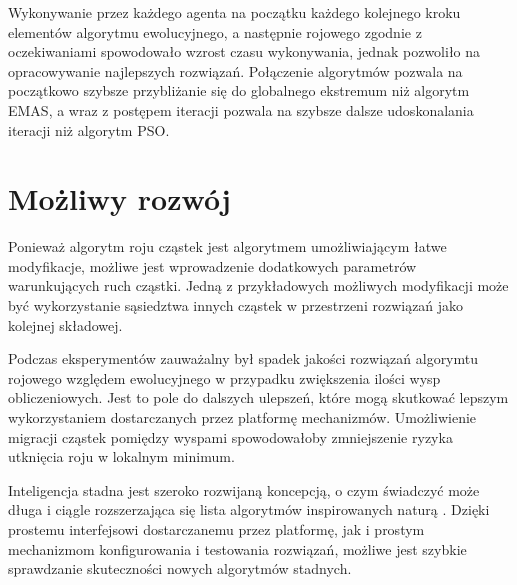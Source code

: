 Wykonywanie przez każdego agenta na początku każdego kolejnego kroku elementów algorytmu ewolucyjnego, a następnie rojowego zgodnie z oczekiwaniami spowodowało wzrost czasu wykonywania, jednak pozwoliło na opracowywanie najlepszych rozwiązań. Połączenie algorytmów pozwala na początkowo szybsze przybliżanie się do globalnego ekstremum niż algorytm EMAS, a wraz z postępem iteracji pozwala na szybsze dalsze udoskonalania iteracji niż algorytm PSO. 



\section{Możliwy rozwój}
Ponieważ algorytm roju cząstek jest algorytmem umożliwiającym łatwe modyfikacje, możliwe jest wprowadzenie dodatkowych parametrów warunkujących ruch cząstki. Jedną z przykładowych możliwych modyfikacji może być wykorzystanie sąsiedztwa innych cząstek w przestrzeni rozwiązań jako kolejnej składowej. 

Podczas eksperymentów zauważalny był spadek jakości rozwiązań algorymtu rojowego względem ewolucyjnego w przypadku zwiększenia ilości wysp obliczeniowych. Jest to pole do dalszych ulepszeń, które mogą skutkować lepszym wykorzystaniem dostarczanych przez platformę mechanizmów. Umożliwienie migracji cząstek pomiędzy wyspami spowodowałoby zmniejszenie ryzyka utknięcia roju w lokalnym minimum.

Inteligencja stadna jest szeroko rozwijaną koncepcją, o czym świadczyć może długa i ciągle rozszerzająca się lista algorytmów inspirowanych naturą \cite{listaswarm}. Dzięki prostemu interfejsowi dostarczanemu przez platformę, jak i prostym mechanizmom konfigurowania i testowania rozwiązań, możliwe jest szybkie sprawdzanie skuteczności nowych algorytmów stadnych. 




